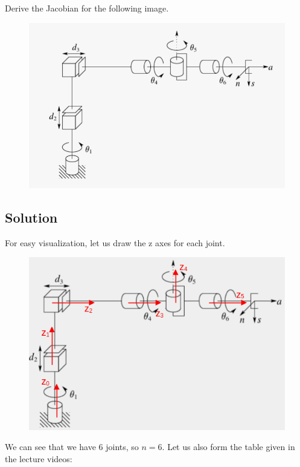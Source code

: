 \documentclass{article}
\begin{document}
Derive the Jacobian for the following image.

\begin{figure}[h]
    \includegraphics[scale=0.25]{jacobian-prob.png}
    \centering
\end{figure}

\subsection{Solution}

For easy visualization, let us draw the z axes for each joint.
\begin{figure}[h]
    \includegraphics[scale=0.5]{jacobian-prob-sketched.png}
    \centering
\end{figure}

We can see that we have 6 joints, so $n = 6$. Let us also form the table given in the lecture videos:
\end{document}
